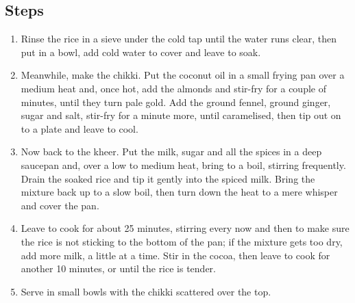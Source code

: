 \documentclass{book}
\begin{document}
\subsection*{Steps}
\begin{enumerate}
\item Rinse the rice in a sieve under the cold tap until the water runs clear, then put in a bowl, add cold water to cover and leave to soak.
\item Meanwhile, make the chikki. Put the coconut oil in a small frying pan over a medium heat and, once hot, add the almonds and stir-fry for a couple of minutes, until they turn pale gold. Add the ground fennel, ground ginger, sugar and salt, stir-fry for a minute more, until caramelised, then tip out on to a plate and leave to cool.
\item Now back to the kheer. Put the milk, sugar and all the spices in a deep saucepan and, over a low to medium heat, bring to a boil, stirring frequently. Drain the soaked rice and tip it gently into the spiced milk. Bring the mixture back up to a slow boil, then turn down the heat to a mere whisper and cover the pan.
\item Leave to cook for about 25 minutes, stirring every now and then to make sure the rice is not sticking to the bottom of the pan; if the mixture gets too dry, add more milk, a little at a time. Stir in the cocoa, then leave to cook for another 10 minutes, or until the rice is tender.
\item Serve in small bowls with the chikki scattered over the top.
\end{enumerate}
\newpage
\end{document}
